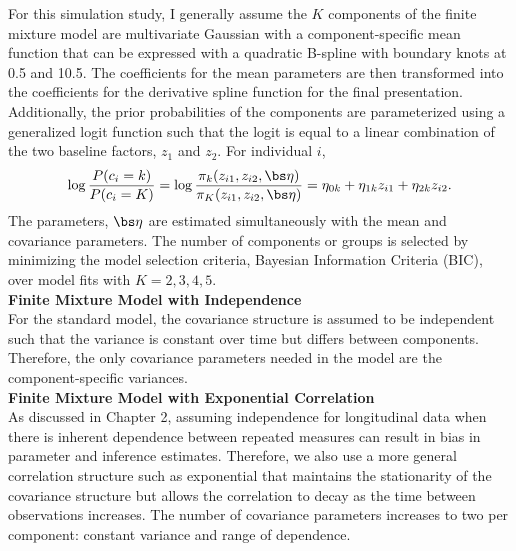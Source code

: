 For this simulation study, I generally assume the $K$ components of the finite mixture model are multivariate Gaussian with a component-specific mean function that can be expressed with a quadratic B-spline with boundary knots at 0.5 and 10.5. The coefficients for the mean parameters are then transformed into the coefficients for the derivative spline function for the final presentation. Additionally, the prior probabilities of the components are parameterized using a generalized logit function such that the logit is equal to a linear combination of the two baseline factors, $z_{1}$ and $z_{2}$. For individual $i$, 
$$\log\frac{P(c_{i}=k)}{P(c_{i}=K)} = \log\frac{\pi_{k}(z_{i1},z_{i2},\bs\eta)}{\pi_{K}(z_{i1},z_{i2},\bs\eta)} =  \eta_{0k}+\eta_{1k}z_{i1}+\eta_{2k}z_{i2}.$$
The parameters, $\bs\eta$ are estimated simultaneously with the mean and covariance parameters. 
The number of components or groups is selected by minimizing the model selection criteria, Bayesian Information Criteria (BIC), over model fits with $K=2,3,4,5$. \\ 

\textbf{Finite Mixture Model with Independence}\\
For the standard model, the covariance structure is assumed to be independent such that the variance is constant over time but differs between components. Therefore, the only covariance parameters needed in the model are the component-specific variances.\\

\textbf{Finite Mixture Model with Exponential Correlation}\\
As discussed in Chapter 2, assuming independence for longitudinal data when there is inherent dependence between repeated measures can result in bias in parameter and inference estimates. Therefore, we also use a more general correlation structure such as exponential that maintains the stationarity of the covariance structure but allows the correlation to decay as the time between observations increases. The number of covariance parameters increases to two per component: constant variance and range of dependence. \\

